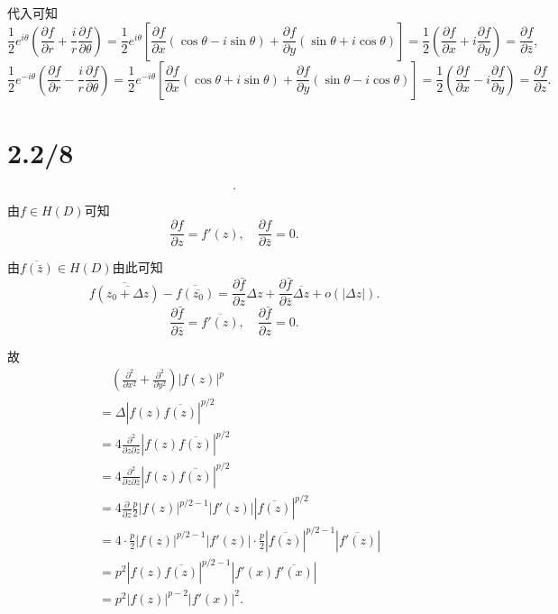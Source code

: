 \documentclass{article}
\begin{document}
代入可知
$$\frac{1}{2}e^{i\theta}\left(\frac{\partial f}{\partial r}+\frac{i}{r}\frac{\partial f}{\partial\theta}\right)=
  \frac{1}{2}e^{i\theta}\left[\frac{\partial f}{\partial x}(\cos\theta-i\sin\theta)+\frac{\partial f}{\partial y}(\sin\theta+i\cos\theta)\right]=
  \frac{1}{2}\left(\frac{\partial f}{\partial x}+i\frac{\partial f}{\partial y}\right)=\frac{\partial f}{\partial\bar{z}},$$
$$\frac{1}{2}e^{-i\theta}\left(\frac{\partial f}{\partial r}-\frac{i}{r}\frac{\partial f}{\partial\theta}\right)=
  \frac{1}{2}e^{-i\theta}\left[\frac{\partial f}{\partial x}(\cos\theta+i\sin\theta)+\frac{\partial f}{\partial y}(\sin\theta-i\cos\theta)\right]=
  \frac{1}{2}\left(\frac{\partial f}{\partial x}-i\frac{\partial f}{\partial y}\right)=\frac{\partial f}{\partial z}.$$



\section{2.2/8}

$$.$$

由$f\in H(D)$可知
$$\frac{\partial f}{\partial z}=f'(z),\quad \frac{\partial f}{\partial\bar{z}}=0.$$

由$\overline{f(\bar{z})}\in H(D)$由此可知
$$\overline{f(\overline{z_0+\Delta z})}-\overline{f(\overline{z_0})}=\frac{\partial\bar{f}}{\partial z}\Delta z+ \frac{\partial\bar{f}}{\partial\bar{z}}\overline{\Delta z}+o(|\Delta z|).$$
$$\frac{\partial\bar{f}}{\partial\bar{z}}=\overline{f'(z)},\quad\frac{\partial\bar{f}}{\partial z}=0.$$

故
\begin{align*}
   & \quad \left(\frac{\partial^2}{\partial x^2}+\frac{\partial^2}{\partial y^2}\right)|f(z)|^p          \\
   & = \Delta|f(z)\overline{f(z)}|^{p/2}                                                                 \\
   & =4\frac{\partial^2}{\partial z\partial\bar{z}}|f(z)\overline{f(z)}|^{p/2}                           \\
   & =4\frac{\partial^2}{\partial z\partial\bar{z}}|f(z)\overline{f(z)}|^{p/2}                           \\
   & = 4\frac{\partial}{\partial\bar{z}}\frac{p}{2}|f(z)|^{p/2-1}|f'(z)||\overline{f(z)}|^{p/2}          \\
   & = 4\cdot\frac{p}{2}|f(z)|^{p/2-1}|f'(z)|\cdot\frac{p}{2}|\overline{f(z)}|^{p/2-1}|\overline{f'(z)}| \\
   & =p^2|f(z)\overline{f(z)}|^{p/2-1}|f'(x)\overline{f'(x)}|                                            \\
   & = p^2|f(z)|^{p-2}|f'(x)|^2.
\end{align*}
\end{document}
